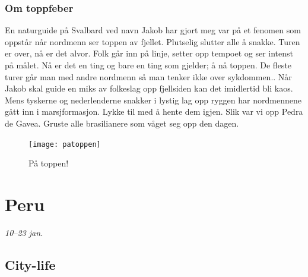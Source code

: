 \subsubsection{Om toppfeber}
En naturguide på Svalbard ved navn Jakob har gjort meg var på et fenomen
som oppstår når nordmenn ser toppen av fjellet. Plutselig slutter alle
å snakke. Turen er over, nå er det alvor. Folk går inn på linje,
setter opp tempoet og ser intenst på målet. Nå er det en ting og bare en ting som gjelder; å nå toppen.
De fleste turer går man med andre nordmenn så man tenker ikke over
sykdommen.. Når Jakob skal guide en miks av folkeslag opp fjellsiden kan det
imidlertid bli kaos. Mens tyskerne og nederlenderne
snakker i lystig lag opp ryggen har nordmennene gått inn i
marsjformasjon. Lykke til med å hente dem igjen. Slik var vi opp Pedra
de Gavea. Gruste alle
brasilianere som våget seg opp den dagen. \\

\begin{figure}[H]
	\centering
	\texttt{[image: patoppen]}
	\caption*{På toppen!}
	\label{fig:toppen}
\end{figure}

\clearpage
\section{Peru} {\footnotesize \textit{10--23 jan.}}
\begin{figure}[H]
	\centering
\noindent{}
	\caption*{}
\label{fig:coverphoto}
\end{figure}

\clearpage
\subsection{City-life}



